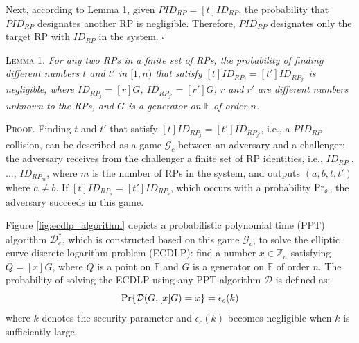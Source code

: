 Next, according to Lemma 1, given $PID_{RP} = [t]ID_{RP}$, the probability that $PID_{RP}$ designates another RP is negligible. %
Therefore, $PID_{RP}$ designates only the target RP with $ID_{RP}$ in the system.  \hfill $\square$

\vspace{1mm}
\noindent\textsc{Lemma 1.} {\em  For any two RPs in a finite set of RPs, the probability of finding different numbers $t$ and $t'$ in $[1,n)$ that satisfy $[t]ID_{RP_j} = [t']ID_{RP_{j'}}$ is negligible, where $ID_{RP_j}=[r]G$, $ID_{RP_{j'}}=[r']G$, $r$ and $r'$ are different numbers unknown to the RPs, and $G$ is a generator on $\mathbb{E}$ of order $n$.}


\oldc
\vspace{0.75mm}
\noindent\textsc{Proof.}
Finding $t$ and $t'$ that satisfy $[t]ID_{RP_j} = [t']ID_{RP_{j'}}$, i.e., a $PID_{RP}$ collision,
    can be described as a game $\mathcal{G}_c$ between an adversary and a challenger: the adversary receives from the challenger a finite set of RP identities, i.e., $ID_{RP_1}$, ..., $ID_{RP_m}$, where $m$ is the number of RPs in the system, and outputs $(a, b, t, t')$ where $a \neq b$.
    If $[t]ID_{RP_a}=[t']ID_{RP_b}$, which occurs with a probability ${\rm Pr}_s$, the adversary succeeds in this game.

Figure \ref{fig:ecdlp_algorithm} depicts a probabilistic polynomial time (PPT) algorithm $\mathcal{D}^*_c$, which is constructed based on this game $\mathcal{G}_c$, to solve the elliptic curve discrete logarithm problem (ECDLP): find a number $x \in \mathbb{Z}_n$ satisfying $Q = [x]G$,
where $Q$ is a point on $\mathbb{E}$ and $G$ is a generator on $\mathbb{E}$ of order $n$. The probability of solving the ECDLP using any PPT algorithm $\mathcal{D}$ is defined as:
\begin{equation*}
{\rm Pr}\{\mathcal{D}(G, [x]G)=x\} = \epsilon_{c}(k)
\end{equation*}
where $k$ denotes the security parameter and $\epsilon_{c}(k)$ becomes negligible when $k$ is sufficiently large.


